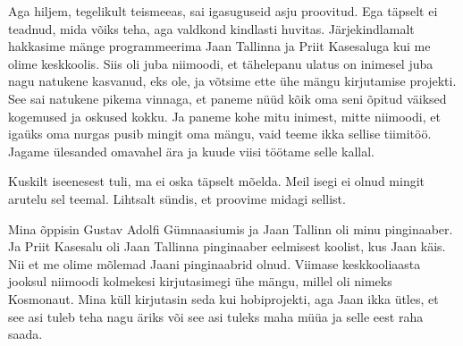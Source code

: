 Aga hiljem, tegelikult teismeeas, sai igasuguseid asju proovitud. Ega täpselt ei 
teadnud, mida võiks  teha, aga valdkond kindlasti huvitas. Järjekindlamalt 
hakkasime mänge programmeerima Jaan Tallinna ja Priit 
Kasesaluga kui me olime keskkoolis. Siis oli 
juba niimoodi, et tähelepanu ulatus on inimesel juba nagu natukene 
kasvanud, eks ole, ja võtsime ette ühe mängu kirjutamise projekti. See sai 
natukene pikema vinnaga, et paneme nüüd kõik oma seni õpitud väiksed kogemused 
ja oskused kokku. Ja paneme kohe mitu inimest, mitte niimoodi, et igaüks oma 
nurgas pusib mingit oma mängu, vaid teeme ikka sellise tiimitöö. Jagame 
ülesanded omavahel ära ja kuude viisi töötame selle kallal. 


Kuskilt iseenesest tuli, ma ei oska täpselt mõelda. Meil isegi ei olnud  
mingit arutelu sel teemal. Lihtsalt sündis, et proovime midagi sellist. 


Mina õppisin Gustav Adolfi Gümnaasiumis
ja Jaan Tallinn oli minu pinginaaber. Ja Priit 
Kasesalu oli Jaan Tallinna pinginaaber eelmisest 
koolist, kus Jaan käis. Nii et me olime mõlemad Jaani pinginaabrid olnud. Viimase keskkooliaasta jooksul niimoodi kolmekesi kirjutasimegi ühe mängu, 
millel oli nimeks Kosmonaut. Mina küll  
kirjutasin seda kui hobiprojekti, aga Jaan ikka ütles, et see asi tuleb teha 
nagu äriks või see asi tuleks maha müüa ja selle eest  raha saada. 


